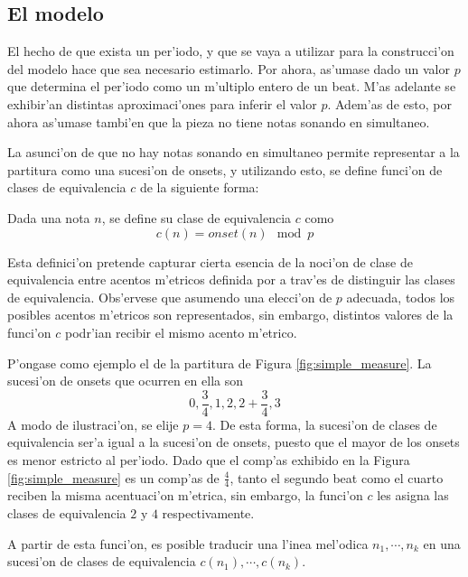 \subsection{El modelo}
\label{sec:rythm_model}
El hecho de que exista un per'iodo, y que se vaya a utilizar para la construcci'on del modelo hace que sea necesario estimarlo. Por ahora, as'umase dado un valor 
$p$ que determina el per'iodo como un m'ultiplo entero de un beat. M'as adelante se exhibir'an distintas aproximaci'ones para inferir el valor $p$. Adem'as
de esto, por ahora as'umase tambi'en que la pieza no tiene notas sonando en simultaneo.

La asunci'on de que no hay notas sonando en simultaneo permite representar a la partitura como una sucesi'on de onsets, y utilizando esto, se define 
funci'on de clases de equivalencia $c$ de la siguiente forma:

\begin{definition}
Dada una nota $n$, se define su clase de equivalencia $c$ como $$c(n) = onset(n)\mod p$$
\end{definition}


Esta definici'on pretende capturar cierta esencia de la noci'on de clase de equivalencia entre acentos m'etricos definida por \cite{Benjamin84} a 
trav'es de distinguir las clases de equivalencia. Obs'ervese que asumendo una elecci'on de $p$ adecuada, todos los posibles acentos m'etricos 
son representados, sin embargo, distintos valores de la funci'on $c$ podr'ian recibir el mismo acento m'etrico. 

P'ongase como ejemplo el de la partitura de Figura \ref{fig:simple_measure}. La sucesi'on de onsets que ocurren en ella son 
$$0, \frac{3}{4}, 1, 2, 2+\frac{3}{4}, 3$$ 
A modo de ilustraci'on, se elije $p=4$. De esta forma, la sucesi'on de clases de equivalencia ser'a igual a la sucesi'on de onsets, puesto que el mayor de los onsets es menor 
estricto al per'iodo. Dado que el comp'as exhibido en la Figura \ref{fig:simple_measure} es un comp'as de $\frac{4}{4}$, tanto el segundo beat 
como el cuarto reciben la misma acentuaci'on m'etrica, sin embargo, la funci'on $c$ les asigna las clases de equivalencia $2$ y $4$ respectivamente.


\begin{imagen}
\end{imagen}

A partir de esta funci'on, es posible traducir una l'inea mel'odica $n_1,\cdots,n_k$ en una sucesi'on de clases de equivalencia $c(n_1),\cdots,c(n_k)$. 

